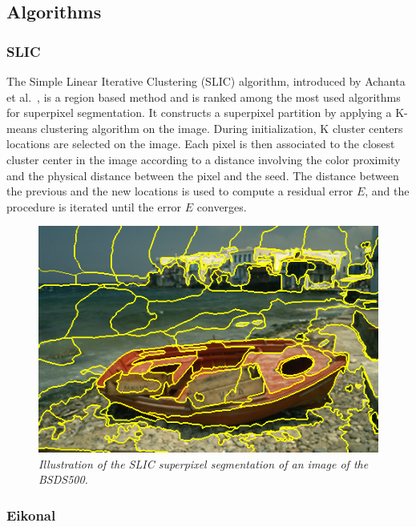 \documentclass{article}
\begin{document}
    \subsection{Algorithms}
        \subsubsection{SLIC}
            The Simple Linear Iterative Clustering (SLIC) algorithm, introduced by Achanta et al.~\cite{achanta2012,achanta2017}, is a region based method and is ranked among the most used algorithms for superpixel segmentation. It constructs a superpixel partition by applying a K-means clustering algorithm on the image. During initialization, K cluster centers locations are selected on the image. Each pixel is then associated to the closest cluster center in the image according to a distance involving the color proximity and the physical distance between the pixel and the seed. The distance between the previous and the new locations is used to compute a residual error $E$, and the procedure is iterated until the error $E$ converges.

            \begin{figure}[!ht]
                \centering
                \includegraphics[width=.5\linewidth]{pics/slic.png}
                \caption{\textit{Illustration of the SLIC superpixel segmentation of an image of the BSDS500.}}
            \end{figure}

        \subsubsection{Eikonal}
            \cite{todo}

\newpage
\end{document}
